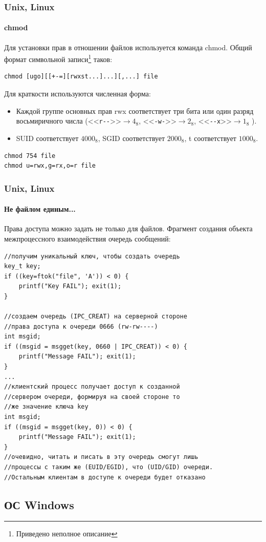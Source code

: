 \begin{frame}[fragile]
    \frametitle{Unix, Linux}
    \framesubtitle{chmod}
    Для установки прав в отношении файлов используется команда chmod. Общий формат символьной записи\footnote{Приведено неполное описание} таков:
\begin{verbatim}
chmod [ugo][[+-=][rwxst...]...][,...] file
\end{verbatim}    
Для краткости используются численная форма:
    \begin{itemize}
        \item Каждой группе основных прав rwx соответствует три бита или один разряд восьмиричного числа (<<\verb"r--">>$\to 4_8$, <<\verb"-w-">>$\to 2_8$, <<\verb"--x">>$\to 1_8$ ).
        \item SUID соответствует $4000_8$, SGID соответствует $2000_8$, t соответствует $1000_8$.
    \end{itemize}
\begin{verbatim}
chmod 754 file
chmod u=rwx,g=rx,o=r file
\end{verbatim}    
\end{frame}


\begin{frame}
    \frametitle{Unix, Linux}
    \framesubtitle{Не файлом единым...}
    Права доступа можно задать не только для файлов. Фрагмент создания объекта межпроцессного взаимодействия \alert{очередь сообщений}:
\begin{verbatim}
//получим уникальный ключ, чтобы создать очередь
key_t key; 
if ((key=ftok("file", 'A')) < 0) {
    printf("Key FAIL"); exit(1);
}

//создаем очередь (IPC_CREAT) на серверной стороне
//права доступа к очереди 0666 (rw-rw----)
int msgid;
if ((msgid = msgget(key, 0660 | IPC_CREAT)) < 0) {
    printf("Message FAIL"); exit(1);
}
...
//клиентский процесс получает доступ к созданной 
//сервером очереди, формируя на своей стороне то 
//же значение ключа key
int msgid;
if ((msgid = msgget(key, 0)) < 0) {
    printf("Message FAIL"); exit(1);
}
//очевидно, читать и писать в эту очередь смогут лишь 
//процессы с таким же (EUID/EGID), что (UID/GID) очереди. 
//Остальным клиентам в доступе к очереди будет отказано
\end{verbatim}    
\end{frame}


\subsection{ОС Windows}


